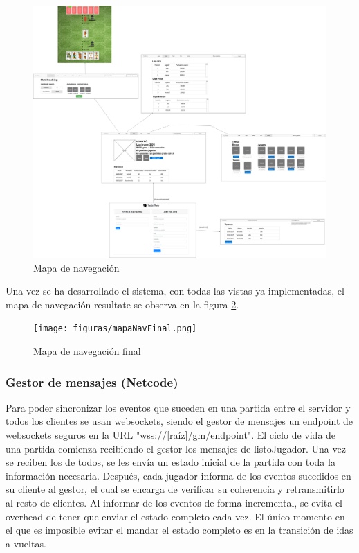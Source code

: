 \begin{figure}
  \includegraphics[width=\linewidth]{figuras/mapaNavegacion.png}
  \caption{Mapa de navegación}
  \label{fig:mapaDeNavegacion}
\end{figure}

Una vez se ha desarrollado el sistema, con todas las vistas ya implementadas, el mapa de navegación resultate se observa en la figura \ref{fig:mapaDeNavegacionFinal}.

\begin{figure}
  \texttt{[image: figuras/mapaNavFinal.png]}
  \caption{Mapa de navegación final}
  \label{fig:mapaDeNavegacionFinal}
\end{figure}

\subsubsection{Gestor de mensajes (Netcode)}

Para poder sincronizar los eventos que suceden en una partida entre el servidor y todos los clientes se usan websockets,
siendo el gestor de mensajes un endpoint de websockets seguros en la URL "wss://[raíz]/gm/endpoint". 
El ciclo de vida de una partida comienza recibiendo el gestor los mensajes de listoJugador. Una vez se reciben los de todos,
se les envía un estado inicial de la partida con toda la información necesaria. Después, cada jugador informa de los eventos
sucedidos en su cliente al gestor, el cual se encarga de verificar su coherencia y retransmitirlo al resto de clientes. Al
informar de los eventos de forma incremental, se evita el overhead de tener que enviar el estado completo cada vez. El único
momento en el que es imposible evitar el mandar el estado completo es en la transición de idas a vueltas.\\

